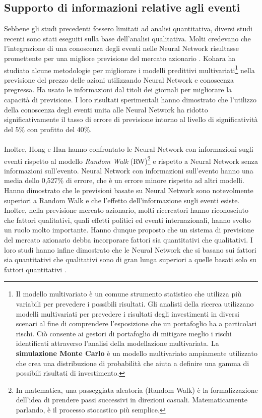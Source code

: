 \documentclass[a4paper,12pt]{report}
\begin{document}
\subsection{Supporto di informazioni relative agli eventi}
Sebbene gli studi precedenti fossero limitati ad analisi quantitativa, diversi studi recenti sono stati eseguiti sulla base dell'analisi qualitativa. Molti credevano che l'integrazione di una conoscenza degli eventi nelle Neural Network risultasse promettente per una migliore previsione del mercato azionario \cite{know-nn}\cite{news-nn}\cite{know-nn2}\cite{news-nn2}. Kohara \cite{know-nn2} ha studiato alcune metodologie per migliorare i modelli predittivi multivariati\footnote{Il modello multivariato è un comune strumento statistico che utilizza più variabili per prevedere i possibili risultati. Gli analisti della ricerca utilizzano modelli multivariati per prevedere i risultati degli investimenti in diversi scenari al fine di comprendere l'esposizione che un portafoglio ha a particolari rischi. Ciò consente ai gestori di portafoglio di mitigare meglio i rischi identificati attraverso l'analisi della modellazione multivariata. La \textbf{simulazione Monte Carlo} è un modello multivariato ampiamente utilizzato che crea una distribuzione di probabilità che aiuta a definire una gamma di possibili risultati di investimento.} nella previsione del prezzo delle azioni utilizzando Neural Network e conoscenza pregressa. Ha usato le informazioni dal titoli dei giornali per migliorare la capacità di previsione. I loro risultati sperimentali hanno dimostrato che l'utilizzo della conoscenza degli eventi unita alle Neural Network ha ridotto significativamente il tasso di errore di previsione intorno al livello di significatività del 5\% con profitto del 40\%.\\~\\
Inoltre, Hong e Han \cite{know-nn} hanno confrontato le Neural Network con informazioni sugli eventi rispetto al modello \textit{Random Walk} (RW)\footnote{In matematica, una passeggiata aleatoria (Random Walk) è la formalizzazione dell'idea di prendere passi successivi in direzioni casuali. Matematicamente parlando, è il processo stocastico più semplice.} e rispetto a Neural Network senza informazioni sull'evento. Neural Network con informazioni sull'evento hanno una media dello 0,527\% di errore, che è un errore minore rispetto ad altri modelli. Hanno dimostrato che le previsioni basate su Neural Network sono notevolmente superiori a Random Walk e che l'effetto dell'informazione sugli eventi esiste.\\
Inoltre, nella previsione mercato azionario, molti ricercatori hanno riconosciuto che fattori qualitativi, quali effetti politici ed eventi internazionali, hanno svolto un ruolo molto importante. Hanno dunque proposto che un sistema di previsione del mercato azionario debba incorporare fattori sia quantitativi che qualitativi. I loro studi hanno infine dimostrato che le Neural Network che si basano sui fattori sia quantitativi che qualitativi sono di gran lunga superiori a quelle basati solo su fattori quantitativi \cite{fuzzy-nn1}\cite{fuzzy-nn2}.
\end{document}
